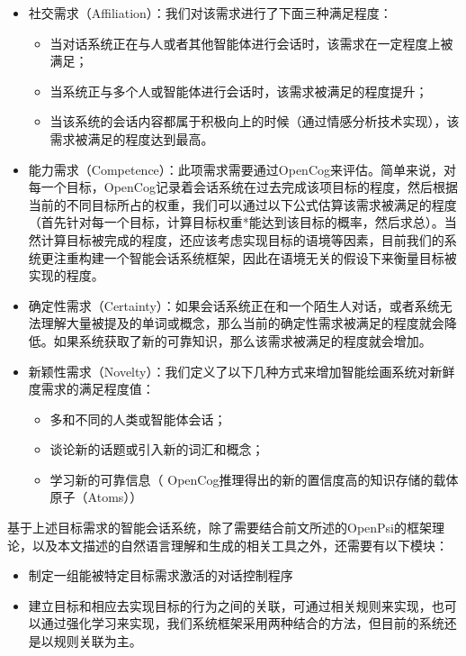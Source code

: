 \begin{itemize}
\item 社交需求（Affiliation）：我们对该需求进行了下面三种满足程度：
\begin{itemize}
\item 当对话系统正在与人或者其他智能体进行会话时，该需求在一定程度上被满足；
\item 当系统正与多个人或智能体进行会话时，该需求被满足的程度提升；
\item  当该系统的会话内容都属于积极向上的时候（通过情感分析技术实现），该需求被满足的程度达到最高。
\end{itemize}
\item 能力需求（Competence）：此项需求需要通过OpenCog来评估。简单来说，对每一个目标，OpenCog记录着会话系统在过去完成该项目标的程度，然后根据当前的不同目标所占的权重，我们可以通过以下公式估算该需求被满足的程度（首先针对每一个目标，计算目标权重*能达到该目标的概率，然后求总）。当然计算目标被完成的程度，还应该考虑实现目标的语境等因素，目前我们的系统更注重构建一个智能会话系统框架，因此在语境无关的假设下来衡量目标被实现的程度。
\item 确定性需求（Certainty）：如果会话系统正在和一个陌生人对话，或者系统无法理解大量被提及的单词或概念，那么当前的确定性需求被满足的程度就会降低。如果系统获取了新的可靠知识，那么该需求被满足的程度就会增加。
\item 新颖性需求（Novelty）：我们定义了以下几种方式来增加智能绘画系统对新鲜度需求的满足程度值：
\begin{itemize}
\item 多和不同的人类或智能体会话；
\item 谈论新的话题或引入新的词汇和概念；
\item 学习新的可靠信息（ OpenCog推理得出的新的置信度高的知识存储的载体原子（Atoms））
\end{itemize}
\end{itemize}

基于上述目标需求的智能会话系统，除了需要结合前文所述的OpenPsi的框架理论，以及本文描述的自然语言理解和生成的相关工具之外，还需要有以下模块：
\begin{itemize}
\item 制定一组能被特定目标需求激活的对话控制程序
\item 建立目标和相应去实现目标的行为之间的关联，可通过相关规则来实现，也可以通过强化学习来实现，我们系统框架采用两种结合的方法，但目前的系统还是以规则关联为主。
\end{itemize}


